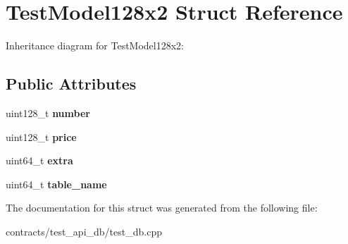 \hypertarget{struct_test_model128x2}{}\section{Test\+Model128x2 Struct Reference}
\label{struct_test_model128x2}


Inheritance diagram for Test\+Model128x2\+:
\subsection*{Public Attributes}
\begin{DoxyCompactItemize}
\item 
\mbox{\label{struct_test_model128x2_ab84c4ac3eb98dbdfe703aa77c5bc6b75}} 
uint128\+\_\+t {\bfseries number}
\item 
\mbox{\label{struct_test_model128x2_ab222dabb3fb2f46837fc24d976444044}} 
uint128\+\_\+t {\bfseries price}
\item 
\mbox{\label{struct_test_model128x2_a9901da3a61304bbd080413fa7112dacc}} 
uint64\+\_\+t {\bfseries extra}
\item 
\mbox{\label{struct_test_model128x2_a4b04b40b8a51cb9eddc260f644aafcd3}} 
uint64\+\_\+t {\bfseries table\+\_\+name}
\end{DoxyCompactItemize}


The documentation for this struct was generated from the following file\+:\begin{DoxyCompactItemize}
\item 
contracts/test\+\_\+api\+\_\+db/test\+\_\+db.\+cpp\end{DoxyCompactItemize}
